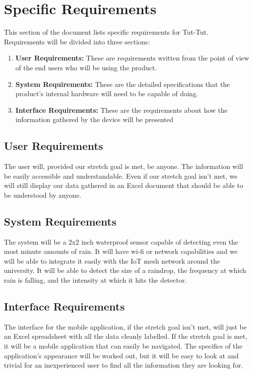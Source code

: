 \documentclass[letterpaper,10pt,draftclsnofoot,onecolumn]{article}
\begin{document}
\section{Specific Requirements}
This section of the document lists specific requirements for Tut-Tut. Requirements will be divided into three sections:
\begin{enumerate}
    \item \textbf{User Requirements: } These are requirements written from the point of view of the end users who will be using the product.
    \item \textbf{System Requirements: } These are the detailed specifications that the product's internal hardware will need to be capable of doing.
    \item \textbf{Interface Requirements: } These are the requirements about how the information gathered by the device will be presented 
\end{enumerate}

\subsection{User Requirements}
The user will, provided our stretch goal is met, be anyone. The information will be easily accessible and understandable. Even if our stretch goal isn't met, we will still display our data gathered in an Excel document that should be able to be understood by anyone.

\subsection{System Requirements}
The system will be a 2x2 inch waterproof sensor capable of detecting even the most minute amounts of rain. It will have wi-fi or network capabilities and we will be able to integrate it easily with the IoT mesh network around the university. It will be able to detect the size of a raindrop, the frequency at which rain is falling, and the intensity at which it hits the detector.

\subsection{Interface Requirements}
The interface for the mobile application, if the stretch goal isn't met, will just be an Excel spreadsheet with all the data cleanly labelled. If the stretch goal is met, it will be a mobile application that can easily be navigated. The specifics of the application's appearance will be worked out, but it will be easy to look at and trivial for an inexperienced user to find all the information they are looking for.
\end{document}
